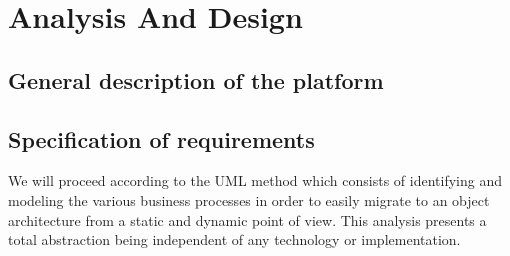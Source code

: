 

\setcounter{mtc}{8}
\chapter{Analysis And Design}%
\label{chap:chapter_two}
\minitoc
\section{General description of the platform}



\section{Specification of requirements}
We will proceed according to the UML method which consists of identifying and modeling the various business processes in order to easily migrate to an object architecture from a static and dynamic point of view. This analysis presents a total abstraction being independent of any technology or implementation.


